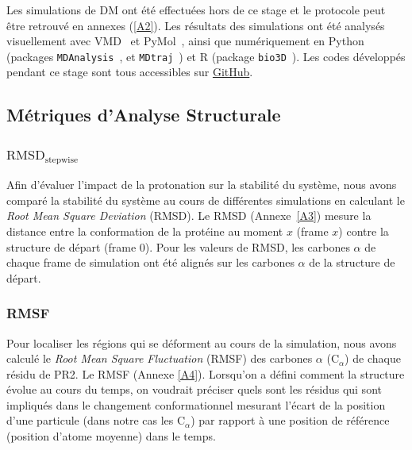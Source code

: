 \documentclass{isddmaster}
\begin{document}
	Les simulations de DM ont été effectuées hors de ce stage et le protocole peut être retrouvé en annexes (\ref{A2}). Les résultats des simulations ont été analysés visuellement avec VMD~\cite{HUMP96} et PyMol~\cite{PyMOL}, ainsi que numériquement en Python (packages \lstinline{MDAnalysis}~\cite{gowersMDAnalysisPythonPackage2016},\cite{michaud-agrawalMDAnalysisToolkitAnalysis2011} et \lstinline{MDtraj}~\cite{McGibbon2015MDTraj}) et R (package  \lstinline{bio3D}~\cite{grantBio3dBiologicalStructure2024}). Les codes développés pendant ce stage sont tous accessibles sur \href{https://github.com/annhater/M1_STAGE}{GitHub}.

	\subsection{Métriques d'Analyse Structurale}
	\subsubsection{$\text{RMSD}_{\text{stepwise}}$}
	Afin d'évaluer l'impact de la protonation sur la stabilité du système, nous avons comparé la stabilité du système au cours de différentes simulations en calculant le \textit{Root Mean Square Deviation} (RMSD). Le RMSD (Annexe~\ref{A3}) mesure la distance entre la conformation de la protéine au moment $x$ (frame $x$) contre la structure de départ (frame 0).
	Pour les valeurs de RMSD, les carbones $\alpha$ de chaque frame de simulation ont été alignés sur les carbones $\alpha$ de la structure de départ.
	
	\subsubsection{RMSF}
	Pour localiser les régions qui se déforment au cours de la simulation, nous avons calculé le \textit{Root Mean Square Fluctuation} (RMSF) des carbones $\alpha$ (C$_\alpha$) de chaque résidu de PR2. Le RMSF (Annexe \ref{A4}).
	Lorsqu'on a défini comment la structure évolue au cours du temps, on voudrait préciser quels sont les résidus qui sont impliqués dans le changement conformationnel mesurant l'écart de la position d'une particule (dans notre cas les C$_\alpha$) par rapport à une position de référence (position d'atome moyenne) dans le temps.
\end{document}
